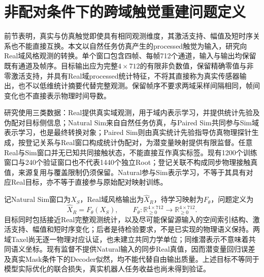 \section{非配对条件下的跨域触觉重建问题定义}
\label{sec:ch05_unpaired_problem}

前节表明，真实与仿真触觉即使具有相同观测维度，其激活支持、幅值及短时序关系也不能直接互换。本文以自然任务仿真产生的processed触觉为输入，研究向Real域风格观测的转换。单个窗口包含四帧、每帧712个通道，输入与输出均保留既有通道及帧序。目标输出应为完整$4\times712$的有限非负数值，保留精确零值与非零激活支持，并具有Real域processed统计特征，不将其直接称为真实传感器输出，也不以低维统计摘要代替完整观测。保留帧序不要求两域采样间隔相同，帧间变化也不直接表示物理时间导数。

研究使用三类数据：Real提供真实域观测，用于域内表示学习，并提供统计先验及伪配对目标侧信息；Natural Sim来自自然任务仿真，与Paired Sim共同参与Sim域表示学习，也是最终转换对象；Paired Sim则由真实统计先验指导仿真物理探针生成，按登记关系与Real窗口构成统计伪配对，为潜变量映射提供有限监督。任意Real与Sim窗口并无已知共同接触状态，不能直接互作真实标签。现有1200个训练窗口与240个验证窗口也不代表1440个独立Root；登记关联不构成同步物理接触真值，来源复用与覆盖限制仍须保留。Natural参与Sim表示学习，不等于其具有对应Real目标，亦不等于直接参与原始配对映射训练。

记Natural Sim窗口为$X_S$，Real域风格输出为$\widehat X_R$，待学习映射为$F_\theta$，问题定义为
\begin{equation}
 \widehat X_R=F_\theta(X_S),\qquad
 F_\theta:\mathbb R_{\geq0}^{4\times712}
 \rightarrow\mathbb R_{\geq0}^{4\times712}.
 \label{eq:ch05_unpaired_mapping}
\end{equation}
目标同时包括接近Real完整观测统计，以及尽可能保留源输入的空间索引结构、激活支持、幅值和短时序变化；后者是待检验要求，不是已实现的物理语义保持。两域Taxel尚无逐一物理对应认证，也未建立共同力学单位；同维潜表示不意味着共同语义坐标。现有监督不提供Natural输入的同步Real真值，因而潜变量回归误差及真实Mask条件下的Decoder似然，均不能代替自由输出质量。上述目标不等同于模型实际优化的联合损失，真实机器人任务收益也尚未得到验证。

